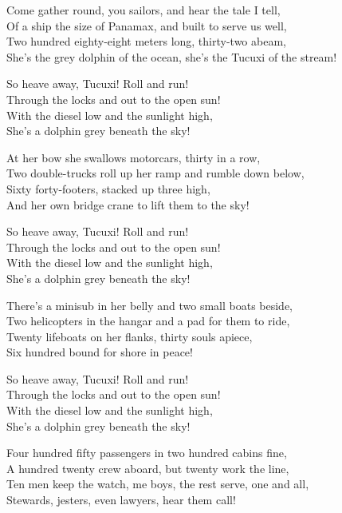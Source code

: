 \begin{lyrics}
Come gather round, you sailors, and hear the tale I tell,\\
Of a ship the size of Panamax, and built to serve us well,\\
Two hundred eighty-eight meters long, thirty-two abeam,\\
She’s the grey dolphin of the ocean, she’s the Tucuxi of the stream!

So heave away, Tucuxi! Roll and run!\\
Through the locks and out to the open sun!\\
With the diesel low and the sunlight high,\\
She’s a dolphin grey beneath the sky!

At her bow she swallows motorcars, thirty in a row,\\
Two double-trucks roll up her ramp and rumble down below,\\
Sixty forty-footers, stacked up three high,\\
And her own bridge crane to lift them to the sky!

So heave away, Tucuxi! Roll and run!\\
Through the locks and out to the open sun!\\
With the diesel low and the sunlight high,\\
She’s a dolphin grey beneath the sky!

There’s a minisub in her belly and two small boats beside,\\
Two helicopters in the hangar and a pad for them to ride,\\
Twenty lifeboats on her flanks, thirty souls apiece,\\
Six hundred bound for shore in peace!

So heave away, Tucuxi! Roll and run!\\
Through the locks and out to the open sun!\\
With the diesel low and the sunlight high,\\
She’s a dolphin grey beneath the sky!

Four hundred fifty passengers in two hundred cabins fine,\\
A hundred twenty crew aboard, but twenty work the line,\\
Ten men keep the watch, me boys, the rest serve, one and all,\\
Stewards, jesters, even lawyers, hear them call!


\end{lyrics}
